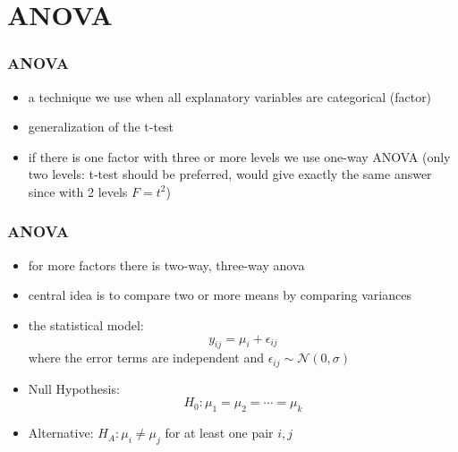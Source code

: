 \section{ANOVA}
\begin{frame}\frametitle{ANOVA}
  \begin{itemize}  
  \item a technique we use when all explanatory variables are categorical (factor)
  \item generalization of the t-test
  \item if there is one factor with three or more levels we use one-way ANOVA (only two levels: t-test should be preferred, would give exactly the same answer since with 2 levels $F=t^2$)
  \end{itemize}
\end{frame}

\begin{frame}\frametitle{ANOVA}
  \begin{itemize}  
  \item for more factors there is two-way, three-way anova 
  \item central idea is to compare two or more means by comparing variances
  \item the statistical model: $$y_{ij} = \mu_i + \epsilon_{ij}$$ where the error terms are independent and $\epsilon_{ij} \sim \mathcal{N}(0,\sigma)$ 
  \item Null Hypothesis: $$H_0: \mu_1=\mu_2=\cdots =\mu_k $$
  \item Alternative: $H_A: \mu_i \neq \mu_j$ for at least one pair $i,j$

  \end{itemize}
\end{frame}

